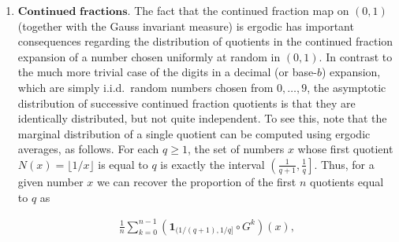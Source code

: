 \begin{enumerate}[label=\arabic*.]
\begin{center}
\end{center}

\noindent \emph{Table: The (approximate) digit frequencies in
Benford's law.}

\begin{xexercise}
Let $n<m$ be positive integers. Prove that if $m$ is
not an integer power of $n$ then $\log_m n$ is an
irrational number.
\end{xexercise}

\item $\textbf{Continued fractions.}$ The fact that the
continued fraction map on $(0,1)$ (together with the
Gauss invariant measure) is ergodic has important
consequences regarding the distribution of quotients
in the continued fraction expansion of a number chosen
uniformly at random in $(0,1)$. In contrast to the
much more trivial case of the digits in a decimal (or
base-$b$) expansion, which are simply i.i.d.\ random
numbers chosen from $0,\ldots,9$, the asymptotic
distribution of successive continued fraction
quotients is that they are identically distributed,
but not quite independent. To see this, note that the
marginal distribution of a single quotient can be
computed using ergodic averages, as follows. For each
$q\ge 1$, the set of numbers $x$ whose first quotient
$N(x)=\lfloor 1/x \rfloor$ is equal to $q$ is exactly
the interval $\left(\frac{1}{q+1},\frac{1}{q}\right]$.
Thus, for a given number $x$ we can recover the
proportion of the first $n$ quotients equal to $q$ as

\begin{align*}
\frac{1}{n} \sum_{k=0}^{n-1} \left(\mathbf{1}_{(1/(q+1),1/q]}\circ G^k\right)(x),
\end{align*}


\end{enumerate}
